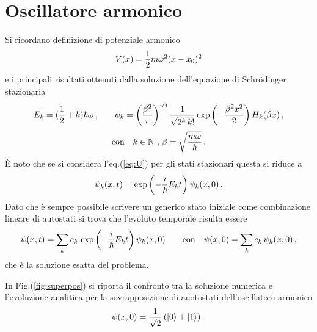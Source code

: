 \documentclass[12pt]{report}
\begin{document}
\section{Oscillatore armonico}
\label{sec:arm}

Si ricordano definizione di potenziale armonico
\begin{equation}
    \centering
    V(x) = \frac{1}{2} m \omega^2 (x -x_0)^2
\end{equation}
e i principali risultati ottenuti dalla soluzione dell'equazione di Schr\"odinger stazionaria
\begin{equation}
    \centering
    E_k = (\frac{1}{2} + k) \hbar \omega \, \text{,} \qquad \psi_{k} = \left( \frac{\beta^2}{\pi} \right)^{\nicefrac{1}{4}} \frac{1}{\sqrt{2^{k} \, k!}} \exp \left(-\frac{\beta^2 x^2}{2}\right) H_{k}(\beta x) \, \text{,}
    \label{eq:arm_res}
\end{equation}
\begin{equation}
    \centering
    \text{con}  \quad k \in \mathbb{N} \text{ ,  } \beta = \sqrt{\frac{m \omega}{\hbar}} \, \text{.}
\end{equation}
È noto che se si considera l'eq.(\ref{eq:U}) per gli stati stazionari questa si riduce a 
\begin{equation}
    \centering
    \psi_{k}(x, t) = \exp \left( - \frac{i}{\hbar} E_k t \right) \psi_{k} (x,0)      \, \text{.}
    \label{eq:ev_eigenstate}
\end{equation}
Dato che è sempre possibile scrivere un generico stato iniziale come combinazione lineare di autostati si trova che l'evoluto temporale risulta essere
\begin{equation}
    \centering
    \psi(x, t) = \sum_{k} c_{k} \, \exp \left( - \frac{i}{\hbar} E_k t \right) \psi_k (x,0) \qquad \text{con} \quad\psi(x,0) = \sum_{k} c_{k} \,  \psi_k (x,0)        \, \text{,}
    \label{eq:ev_combinazione}
\end{equation}
che è la soluzione esatta del problema.

In Fig.(\ref{fig:superpos}) si riporta il confronto tra la soluzione numerica e l'evoluzione analitica per la sovrapposizione di auotostati dell'oscillatore armonico
\begin{equation}
    \centering
    \psi(x, 0) = \frac{1}{\sqrt{2}} \left( \ket{0} + \ket{1} \right)   \, \text{.}
    \label{eq:superpos}
\end{equation}
\end{document}

